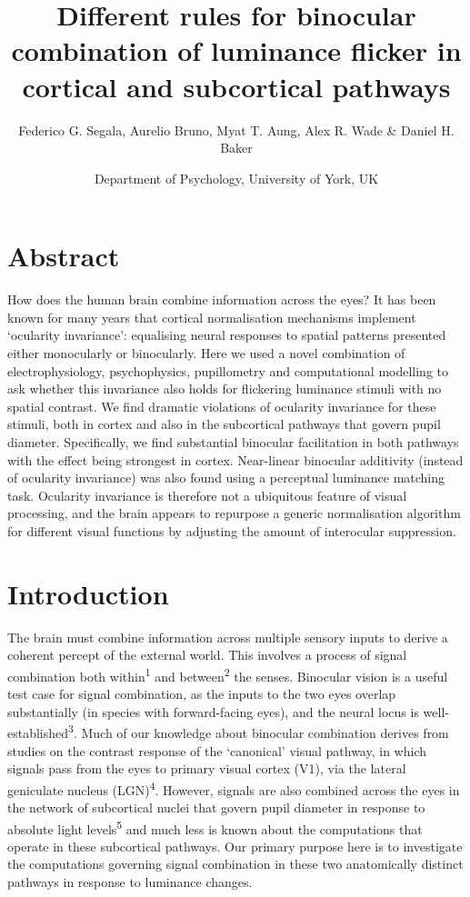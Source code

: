 \documentclass[
]{article}
\title{Different rules for binocular combination of luminance flicker in cortical and subcortical pathways}
\author{Federico G. Segala, Aurelio Bruno, Myat T. Aung, Alex R. Wade \& Daniel H. Baker}
\date{Department of Psychology, University of York, UK}
\begin{document}
\maketitle

\hypertarget{abstract}{%
\section{Abstract}\label{abstract}}

How does the human brain combine information across the eyes? It has been known for many years that cortical normalisation mechanisms implement `ocularity invariance': equalising neural responses to spatial patterns presented either monocularly or binocularly. Here we used a novel combination of electrophysiology, psychophysics, pupillometry and computational modelling to ask whether this invariance also holds for flickering luminance stimuli with no spatial contrast. We find dramatic violations of ocularity invariance for these stimuli, both in cortex and also in the subcortical pathways that govern pupil diameter. Specifically, we find substantial binocular facilitation in both pathways with the effect being strongest in cortex. Near-linear binocular additivity (instead of ocularity invariance) was also found using a perceptual luminance matching task. Ocularity invariance is therefore not a ubiquitous feature of visual processing, and the brain appears to repurpose a generic normalisation algorithm for different visual functions by adjusting the amount of interocular suppression.

\hypertarget{introduction}{%
\section{Introduction}\label{introduction}}

The brain must combine information across multiple sensory inputs to derive a coherent percept of the external world. This involves a process of signal combination both within\textsuperscript{1} and between\textsuperscript{2} the senses. Binocular vision is a useful test case for signal combination, as the inputs to the two eyes overlap substantially (in species with forward-facing eyes), and the neural locus is well-established\textsuperscript{3}. Much of our knowledge about binocular combination derives from studies on the contrast response of the `canonical' visual pathway, in which signals pass from the eyes to primary visual cortex (V1), via the lateral geniculate nucleus (LGN)\textsuperscript{4}. However, signals are also combined across the eyes in the network of subcortical nuclei that govern pupil diameter in response to absolute light levels\textsuperscript{5} and much less is known about the computations that operate in these subcortical pathways. Our primary purpose here is to investigate the computations governing signal combination in these two anatomically distinct pathways in response to luminance changes.
\end{document}
